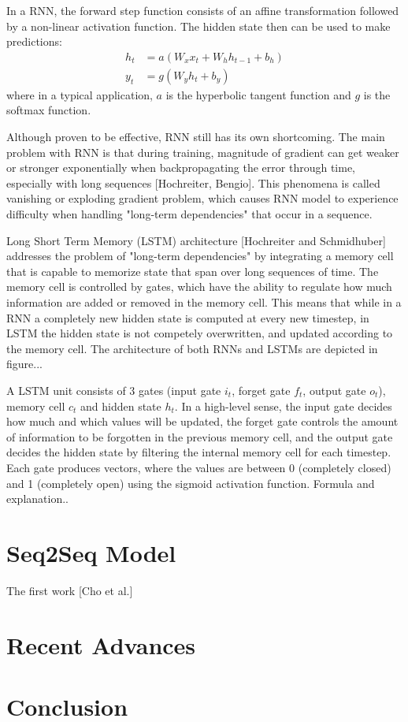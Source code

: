\documentclass[12pt]{extarticle}
\begin{document}
In a RNN, the forward step function consists of an affine transformation followed by a non-linear activation function. The hidden state then can be used to make predictions:
\begin{align*}
h_{t} &= a(W_{x}x_{t} + W_{h}h_{t-1} + b_{h})\\
y_{t} &= g(W_{y}h_{t} + b_{y}) 
\end{align*}
where in a typical application, $a$ is the hyperbolic tangent function and $g$ is the softmax function.

Although proven to be effective, RNN still has its own shortcoming. The main problem with RNN is that during training, magnitude of gradient can get weaker or stronger exponentially when backpropagating the error through time, especially with long sequences [Hochreiter, Bengio]. This phenomena is called vanishing or exploding gradient problem, which causes RNN model to experience difficulty when handling "long-term dependencies" that occur in a sequence.

Long Short Term Memory (LSTM) architecture [Hochreiter and Schmidhuber] addresses the problem of "long-term dependencies" by integrating a memory cell that is capable to memorize state that span over long sequences of time. The memory cell is controlled by gates, which have the ability to regulate how much information are added or removed in the memory cell. This means that while in a RNN a completely new hidden state is computed at every new timestep, in LSTM the hidden state is not competely overwritten, and updated according to the memory cell. The architecture of both RNNs and LSTMs are depicted in figure...  

A LSTM unit consists of 3 gates (input gate $i_{t}$, forget gate $f_{t}$, output gate $o_{t}$), memory cell $c_{t}$ and hidden state $h_{t}$. In a high-level sense, the input gate decides how much and which values will be updated, the forget gate controls the amount of information to be forgotten in the previous memory cell, and the output gate decides the hidden state by filtering the internal memory cell for each timestep. Each gate produces vectors, where the values are between 0 (completely closed) and 1 (completely open) using the sigmoid activation function. Formula and explanation..





\section*{Seq2Seq Model}
The first work [Cho et al.]

\section*{Recent Advances} %

\section*{Conclusion}
\end{document}

